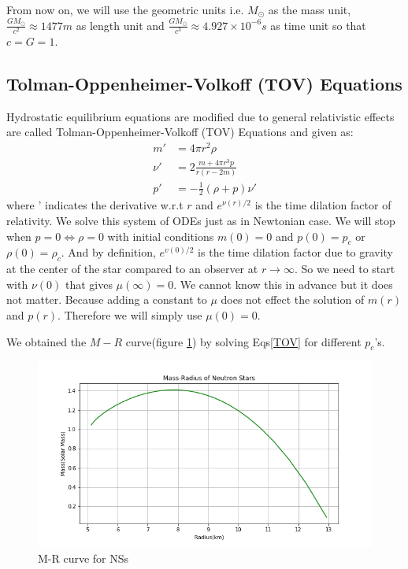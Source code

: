 \documentclass[aps,twocolumn,showpacs,preprintnumbers,nofootinbib,prl,superscriptaddress,groupedaddress]{revtex4-1}
\begin{document}
From now on, we will use the geometric units i.e. $ M_\odot $ as the mass unit, $ \frac{GM_\odot }{c^2} \approx 1477m$ as length unit and $ \frac{GM_\odot }{c^3} \approx 4.927\times10^{-6}s$ as time unit so that $c = G = 1$. 

\subsection{Tolman-Oppenheimer-Volkoff (TOV) Equations}
Hydrostatic equilibrium equations are modified due to general relativistic effects are called Tolman-Oppenheimer-Volkoff (TOV) Equations and given as:
\begin{align}\label{TOV}
	m' &= 4\pi r^2 \rho\\
	\nu' &= 2\frac{m + 4\pi r^3p }{r(r-2m)}\nonumber\\
	p' &= - \frac{1}{2}(\rho + p )\nonumber\nu' 
\end{align}
where ' indicates the derivative w.r.t $ r $ and $e^{\nu(r)/2}$ is the time dilation factor of relativity. We solve this system of ODEs just as in Newtonian case. We will stop when $p =0 \iff \rho = 0$ with initial conditions $m(0) = 0 $ and $ p(0) = p_c$ or $\rho(0) = \rho_c$. And by definition, $e^{v(0)/2}$ is the time dilation factor due to gravity at the center of the star compared to an observer at $ r\rightarrow \infty $. So we need to start with $ \nu(0) $ that gives $ \mu(\infty) = 0 $. We cannot know this in advance but it does not matter. Because adding a constant to $ \mu $ does not effect the solution of $ m(r) $ and $ p(r) $. Therefore we will simply use $ \mu(0) = 0 $. 

We obtained the $ M-R $ curve(figure \ref{fig:mass-radius-of-neutron-stars}) by solving Eqs\ref{TOV} for different $p_c$'s. 

\begin{figure}
	\centering
	\includegraphics[width=1.0\linewidth]{"Figures/Figures_Einstein/Mass-Radius of Neutron Stars"}
	\caption{M-R curve for NSs}
	\label{fig:mass-radius-of-neutron-stars}
\end{figure}
\end{document}
